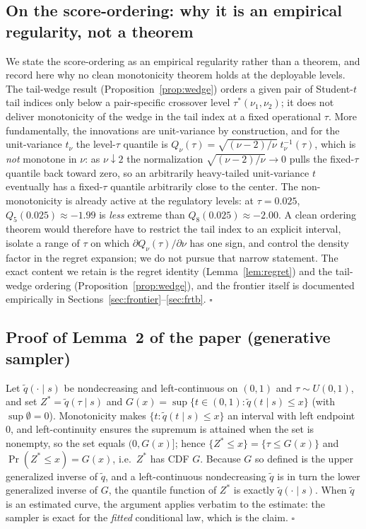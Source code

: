 \documentclass[11pt]{article}
\theoremstyle{remark}
\begin{document}
\subsection*{On the score-ordering: why it is an empirical regularity, not a theorem}
We state the score-ordering as an empirical regularity rather than a
theorem, and record here why no clean monotonicity theorem holds at the
deployable levels. The tail-wedge result (Proposition~\ref{prop:wedge})
orders a given pair of Student-$t$ tail indices only below a pair-specific
crossover level $\tau^*(\nu_1,\nu_2)$; it does not deliver monotonicity of
the wedge in the tail index at a fixed operational $\tau$. More
fundamentally, the innovations are unit-variance by construction, and for
the unit-variance $t_\nu$ the level-$\tau$ quantile is
$Q_\nu(\tau)=\sqrt{(\nu-2)/\nu}\;t_\nu^{-1}(\tau)$, which is \emph{not}
monotone in $\nu$: as $\nu\downarrow2$ the normalization
$\sqrt{(\nu-2)/\nu}\to0$ pulls the fixed-$\tau$ quantile back toward zero,
so an arbitrarily heavy-tailed unit-variance $t$ eventually has a
fixed-$\tau$ quantile arbitrarily close to the center. The non-monotonicity
is already active at the regulatory levels: at $\tau=0.025$,
$Q_5(0.025)\approx-1.99$ is \emph{less} extreme than
$Q_8(0.025)\approx-2.00$. A clean ordering theorem would therefore have to
restrict the tail index to an explicit interval, isolate a range of $\tau$
on which $\partial Q_\nu(\tau)/\partial\nu$ has one sign, and control the
density factor in the regret expansion; we do not pursue that narrow
statement. The exact content we retain is the regret identity
(Lemma~\ref{lem:regret}) and the tail-wedge ordering
(Proposition~\ref{prop:wedge}), and the frontier itself is documented
empirically in Sections~\ref{sec:frontier}--\ref{sec:frtb}.
\hfill$\square$

\subsection*{Proof of Lemma~2 of the paper (generative sampler)}
Let $\widetilde{q}(\cdot \mid s)$ be nondecreasing and left-continuous
on $(0,1)$ and $\tau \sim U(0,1)$, and set
$Z^*=\widetilde q(\tau\mid s)$ and
$G(x)=\sup\{t\in(0,1):\widetilde q(t\mid s)\le x\}$ (with
$\sup\emptyset=0$). Monotonicity makes
$\{t:\widetilde q(t\mid s)\le x\}$ an interval with left endpoint $0$,
and left-continuity ensures the supremum is attained when the set is
nonempty, so the set equals $(0,G(x)]$; hence
$\{Z^*\le x\}=\{\tau\le G(x)\}$ and
$\Pr(Z^*\le x)=G(x)$, i.e.\ $Z^*$ has CDF $G$. Because $G$ so defined
is the upper generalized inverse of $\widetilde q$, and a
left-continuous nondecreasing $\widetilde q$ is in turn the lower
generalized inverse of $G$, the quantile function of $Z^*$ is exactly
$\widetilde q(\cdot\mid s)$. When $\widetilde q$ is an estimated curve,
the argument applies verbatim to the estimate: the sampler is exact for
the \emph{fitted} conditional law, which is the claim. $\square$
\end{document}
